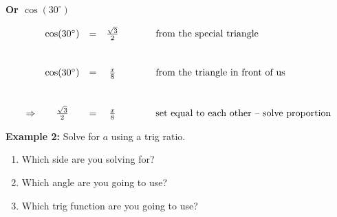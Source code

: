 \documentclass[12pt]{article}
\begin{document}
\vspace{.5in}

\textbf{Or $\cos(30^\circ)$}

\[
\begin{array}{c c c c l}
				&\cos(30^{\circ})	&		= & 	\frac{\sqrt{3}}{2}  & \hspace{1cm}\text{from the special triangle} \vspace{1cm} \\
				
				&\cos(30^{\circ})	&		= & 	\frac{x}{8}  	& \hspace{1cm} \text{from the triangle in front of us}\vspace{1cm} \\
				
	\Rightarrow &\frac{\sqrt{3}}{2}	&		= &		\frac{x}{8} 		& \hspace{1cm} \text{set equal to each other -- solve proportion} \\
\end{array}
\]

\pagebreak

\textbf{Example 2:} Solve for $a$ using a trig ratio.\\

\begin{center}
\end{center}

\begin{enumerate}

	\item Which side are you solving for?
	
	\item Which angle are you going to use?
	
	\item Which trig function are you going to use?

\end{enumerate}

\vspace{2in}
\end{document}

